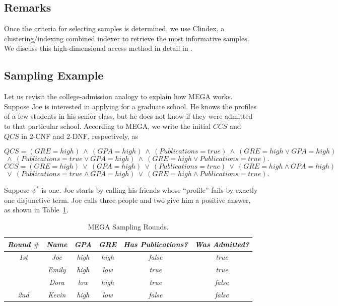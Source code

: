 \subsection*{Remarks}

Once the criteria for selecting samples is determined, we
use Clindex, a clustering/indexing combined indexer to retrieve
the most informative samples.  We discuss this high-dimensional
access method in detail in \cite{Lch00}.  

\subsection*{Sampling Example}

Let us revisit the college-admission analogy to explain
how MEGA works. Suppose Joe is interested in applying for 
a graduate school.
He knows the profiles of a few students in his 
senior class, but he does not know if they were admitted
to that particular school. 
According to MEGA, we write the initial $CCS$ and $QCS$ in
$2$-CNF and $2$-DNF, respectively, as

\sspace
\[
QCS = (GRE = high)~ \wedge ~(GPA = high)~ \wedge~ (Publications = true) 
~\wedge~ (GRE = high \vee GPA = high) 
\]
\[
~\wedge~ (Publications = true \vee GPA = high) ~\wedge~
(GRE = high \vee Publications = true).
\]
\vspace{-.1in}
\[
CCS = (GRE = high)~ \vee ~(GPA = high)~ \vee~ (Publications = true) 
~\vee~ (GRE = high \wedge GPA = high) 
\]
\[
~\vee~ (Publications = true \wedge GPA = high) ~\vee~ 
(GRE = high \wedge Publications = true).
\]
\nspace

Suppose $\psi^{*}$ is one. 
Joe starts by calling his friends
whose ``profile'' fails by exactly one disjunctive term.
Joe calls three people and two give him a positive answer,
as shown in Table~\ref{tab-round1}.

\begin{table}[ht]
\begin{footnotesize}
\begin{center}
\begin{tabular}{|c|c|c|c|c|c|} \hline
{\it Round $\#$} & {\it Name} & {\it GPA} & {\it GRE} & {\it Has Publications?} & {\it Was Admitted?}\\ \hline
\hline
{\it 1st} & {\it Joe} & {\it high} & {\it high} & {\it false} & {\it true} \\
{} & {\it Emily} & {\it high} & {\it low} & {\it true} & {\it true} \\
{} & {\it Dora} & {\it low} & {\it high} & {\it true} & {\it false} \\
\hline \hline
{\it 2nd} & {\it Kevin} & {\it high} & {\it low} & {\it false} & {\it false} \\
\hline \hline
\end{tabular}
\end{center}
\end{footnotesize}
\caption{MEGA Sampling Rounds.}
\label{tab-round1}
\end{table}
                             
